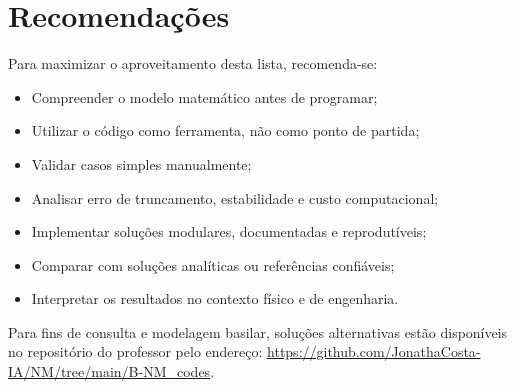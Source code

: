 \documentclass[12pt]{elsarticle}
\begin{document}
\section*{Recomendações}
\noindent
Para maximizar o aproveitamento desta lista, recomenda-se:
\begin{itemize}
    \item Compreender o modelo matemático antes de programar;
    \item Utilizar o código como ferramenta, não como ponto de partida;
    \item Validar casos simples manualmente;
    \item Analisar erro de truncamento, estabilidade e custo computacional;
    \item Implementar soluções modulares, documentadas e reprodutíveis;
    \item Comparar com soluções analíticas ou referências confiáveis;
    \item Interpretar os resultados no contexto físico e de engenharia.
\end{itemize}

\clearpage
Para fins de consulta e modelagem basilar, soluções alternativas estão disponíveis no repositório do professor pelo endereço: \url{https://github.com/JonathaCosta-IA/NM/tree/main/B-NM_codes}.




\renewcommand{\bibsection}{\section*{REFER\^ENCIAS BIBLIOGR\'AFICAS}}


\end{document}
